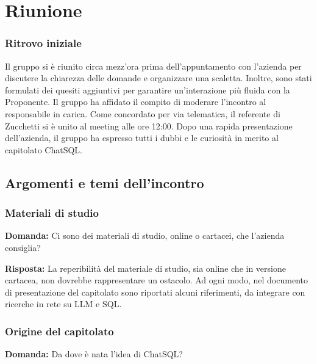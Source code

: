 \section{Riunione}

\subsubsection{Ritrovo iniziale}
Il gruppo si è riunito circa mezz'ora prima dell'appuntamento con l'azienda per discutere la chiarezza delle domande e organizzare una scaletta. Inoltre, sono stati formulati dei quesiti aggiuntivi per garantire un'interazione più fluida con la Proponente. Il gruppo ha affidato il compito di moderare l'incontro al responsabile in carica. Come concordato per via telematica, il referente di Zucchetti si è unito al meeting alle ore 12:00. Dopo una rapida presentazione dell'azienda, il gruppo ha espresso tutti i dubbi e le curiosità in merito al capitolato ChatSQL.

\subsection{Argomenti e temi dell'incontro}

\subsubsection{Materiali di studio}
\textbf{Domanda:} Ci sono dei materiali di studio, online o cartacei, che l'azienda consiglia?

\textbf{Risposta:} La reperibilità del materiale di studio, sia online che in versione cartacea, non dovrebbe rappresentare un ostacolo. Ad ogni modo, nel documento di presentazione del capitolato sono riportati alcuni riferimenti, da integrare con ricerche in rete su LLM e SQL.

\subsubsection{Origine del capitolato}
\textbf{Domanda:} Da dove è nata l'idea di ChatSQL?

